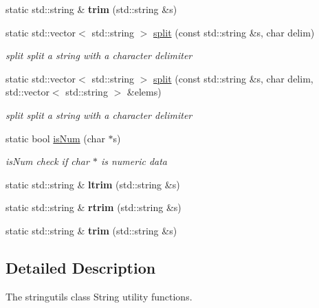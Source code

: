 \begin{DoxyCompactItemize}
\item 
\hypertarget{classstringutils_a1b03731449410613ccb73f0213036dac}{static std\-::string \& {\bfseries trim} (std\-::string \&s)}\label{classstringutils_a1b03731449410613ccb73f0213036dac}

\item 
static std\-::vector$<$ std\-::string $>$ \hyperlink{classstringutils_a20745a2b1f3ae2a4c863e65838fc1bef}{split} (const std\-::string \&s, char delim)
\begin{DoxyCompactList}\small\item\em split split a string with a character delimiter \end{DoxyCompactList}\item 
static std\-::vector$<$ std\-::string $>$ \hyperlink{classstringutils_a9d2982b0d17c5fe3911bf1b08ecef115}{split} (const std\-::string \&s, char delim, std\-::vector$<$ std\-::string $>$ \&elems)
\begin{DoxyCompactList}\small\item\em split split a string with a character delimiter \end{DoxyCompactList}\item 
static bool \hyperlink{classstringutils_a75dff8d4b767b34d3c25add0baea6ffc}{is\-Num} (char $\ast$s)
\begin{DoxyCompactList}\small\item\em is\-Num check if char $\ast$ is numeric data \end{DoxyCompactList}\item 
\hypertarget{classstringutils_afb1addddb00afafa45447dc16e73a320}{static std\-::string \& {\bfseries ltrim} (std\-::string \&s)}\label{classstringutils_afb1addddb00afafa45447dc16e73a320}

\item 
\hypertarget{classstringutils_a7326b94129fb258d0ed42e0228b3a5b2}{static std\-::string \& {\bfseries rtrim} (std\-::string \&s)}\label{classstringutils_a7326b94129fb258d0ed42e0228b3a5b2}

\item 
\hypertarget{classstringutils_a1b03731449410613ccb73f0213036dac}{static std\-::string \& {\bfseries trim} (std\-::string \&s)}\label{classstringutils_a1b03731449410613ccb73f0213036dac}

\end{DoxyCompactItemize}


\subsection{Detailed Description}
The stringutils class String utility functions. 

